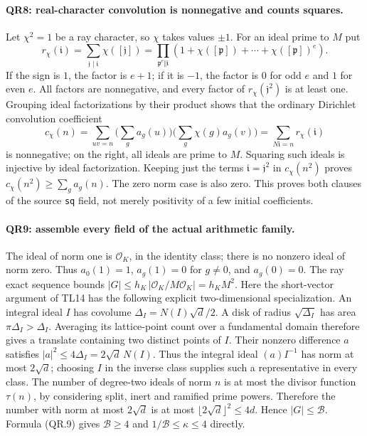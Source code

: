 \paragraph{QR8: real-character convolution is nonnegative and counts squares.}
Let $\chi^2=1$ be a ray character, so $\chi$ takes values $\pm1$.
For an ideal prime to $M$ put
\[
 r_\chi(\mathfrak i)=\sum_{\mathfrak j\mid\mathfrak i}
                  \chi([\mathfrak j])
 =\prod_{\mathfrak p^e\Vert\mathfrak i}
       (1+\chi([\mathfrak p])+\cdots+\chi([\mathfrak p])^e).
                                                               \tag{QR.15}
\]
If the sign is $1$, the factor is $e+1$; if it is $-1$, the factor
is $0$ for odd $e$ and $1$ for even $e$. All factors are nonnegative,
and every factor of $r_\chi(\mathfrak j^2)$ is at least one.
Grouping ideal factorizations by their product shows that the ordinary
Dirichlet convolution coefficient
\[
 c_\chi(n)=\sum_{uv=n}\Big(\sum_g a_g(u)\Big)
                              \Big(\sum_g\chi(g)a_g(v)\Big)
       =\sum_{N\mathfrak i=n}r_\chi(\mathfrak i)           \tag{QR.16}
\]
is nonnegative; on the right, all ideals are prime to $M$.
Squaring such ideals is injective by ideal factorization. Keeping just
the terms $\mathfrak i=\mathfrak j^2$ in $c_\chi(n^2)$ proves
$c_\chi(n^2)\ge\sum_g a_g(n)$. The zero norm case is also zero.
This proves both clauses of the source \texttt{sq} field, not merely
positivity of a few initial coefficients.

\paragraph{QR9: assemble every field of the actual arithmetic family.}
The ideal of norm one is $\mathcal O_K$, in the identity class;
there is no nonzero ideal of norm zero. Thus
$a_0(1)=1$, $a_g(1)=0$ for $g\ne0$, and $a_g(0)=0$.
The ray exact sequence bounds
$|G|\le h_K\,|\mathcal O_K/M\mathcal O_K|=h_KM^2$.
Here the short-vector argument of TL14 has the following explicit
two-dimensional specialization. An integral ideal $I$ has covolume
$\Delta_I=N(I)\sqrt d/2$. A disk of radius $\sqrt{\Delta_I}$ has
area $\pi\Delta_I>\Delta_I$. Averaging its lattice-point count over
a fundamental domain therefore gives a translate containing two
distinct points of $I$. Their nonzero difference $a$ satisfies
$|a|^2\le4\Delta_I=2\sqrt d\,N(I)$. Thus the integral ideal
$(a)I^{-1}$ has norm at most $2\sqrt d$; choosing $I$ in the inverse
class supplies such a representative in every class.
The number of degree-two ideals of
norm $n$ is at most the divisor function $\tau(n)$, by considering
split, inert and ramified prime powers. Therefore the number with
norm at most $2\sqrt d$ is at most
$\lfloor2\sqrt d\rfloor^2\le4d$. Hence $|G|\le\mathcal B$.
Formula (QR.9) gives $\mathcal B\ge4$ and
$1/\mathcal B\le\kappa\le4$ directly.


